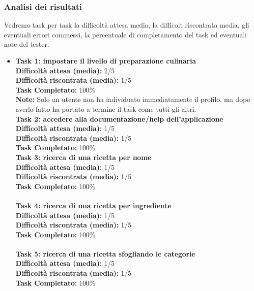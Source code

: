 \subsubsection*{Analisi dei risultati}
Vedremo task per task la difficoltà attesa media, la difficolt
 riscontrata media, gli eventuali errori commessi, la percentuale di
completamento del task ed eventuali note del tester.
\begin{itemize}

\item 
\textbf{Task 1: impostare il livello di preparazione culinaria}\\
\textbf{Difficoltà attesa (media):} 2/5\\
\textbf{Difficoltà riscontrata (media):} 1/5\\
\textbf{Task Completato:} 100\%\\
\textbf{Note:} Solo un utente non ha individuato immediatamente il
profilo, ma dopo averlo fatto ha portato a termine il task come tutti
gli altri.\\

\textbf{Task 2: accedere alla documentazione/help dell'applicazione}\\
\textbf{Difficoltà attesa (media):} 1/5\\
\textbf{Difficoltà riscontrata (media):} 1/5\\
\textbf{Task Completato:} 100\%\\


\textbf{Task 3: ricerca di una ricetta per nome}\\
\textbf{Difficoltà attesa (media):} 1/5\\
\textbf{Difficoltà riscontrata (media):} 1/5\\
\textbf{Task Completato:} 100\%\\\\

\textbf{Task 4: ricerca di una ricetta per ingrediente}\\
\textbf{Difficoltà attesa (media):} 1/5\\
\textbf{Difficoltà riscontrata (media):} 1/5\\
\textbf{Task Completato:} 100\%\\\\

\textbf{Task 5: ricerca di una ricetta sfogliando le categorie}\\
\textbf{Difficoltà attesa (media):} 1/5\\
\textbf{Difficoltà riscontrata (media):} 1/5\\
\textbf{Task Completato:} 100\%\\\\



\end{itemize}
